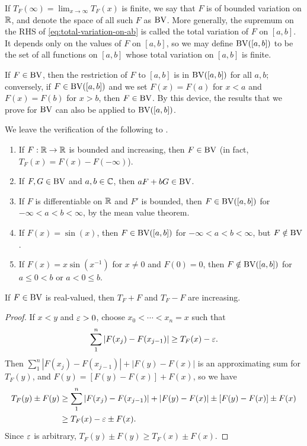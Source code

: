 \documentclass[12pt]{article} %
\begin{document}
\begin{definition}
    If $T_F(\infty) = \lim_{x \to \infty} T_F(x)$ is finite, we say that $F$ is of bounded variation on $\mathbb{R}$, and denote the space of all such $F$ as $\operatorname{BV}$. More generally, the supremum on the RHS of \cref{eq:total-variation-on-ab} is called the total variation of $F$ on $[a,b]$. It depends only on the values of $F$ on $[a,b]$, so we may define $\operatorname{BV}([a,b])$ to be the set of all functions on $[a,b]$ whose total variation on $[a,b]$ is finite.
\end{definition}

\begin{remark}
    If $F \in \operatorname{BV}$, then the restriction of $F$ to $[a,b]$ is in $\operatorname{BV}([a, b])$ for all $a, b$; conversely, if $F \in \operatorname{BV}([a, b])$ and we set $F(x) = F(a)$ for $x < a$ and $F(x) = F(b)$ for $x > b$, then $F \in \operatorname{BV}$. By this device, the results that we prove for $\operatorname{BV}$ can also be applied to $\operatorname{BV}([a,b])$.
\end{remark}

\begin{example}
    We leave the verification of the following to \citet[Exercise~27]{folland1999real}. \begin{enumerate}
        \item If $F : \mathbb{R} \to \mathbb{R}$ is bounded and increasing, then $F \in \operatorname{BV}$ (in fact, $T_F(x) = F(x) - F(-\infty)$).
        \item If $F, G \in \operatorname{BV}$ and $a, b \in \mathbb{C}$, then $aF + bG \in \operatorname{BV}$.
        \item If $F$ is differentiable on $\mathbb{R}$ and $F'$ is bounded, then $F \in \operatorname{BV}([a,b])$ for $-\infty < a < b < \infty$, by the mean value theorem.
        \item If $F(x) = \sin(x)$, then $F \in \operatorname{BV}([a,b])$ for $-\infty < a < b < \infty$, but $F \notin \operatorname{BV}$.
        \item If $F(x) = x \sin(x^{-1})$ for $x \neq 0$ and $F(0) = 0$, then $F \notin \operatorname{BV}([a, b])$ for $a \leq 0 < b$ or $a < 0 \leq b$.
    \end{enumerate}
\end{example}

\begin{lemma}\label{lem:3.26}
    If $F \in \operatorname{BV}$ is real-valued, then $T_F + F$ and $T_F - F$ are increasing.
\end{lemma}

\begin{proof}
    If $x < y$ and $\varepsilon > 0$, choose $x_0 < \cdots < x_n = x$ such that \[\sum_1^n |F(x_j) - F(x_{j-1})| \geq T_F(x) - \varepsilon.\] Then $\sum_1^n |F(x_j) - F(x_{j-1})| + |F(y) - F(x)|$ is an approximating sum for $T_F(y)$, and $F(y) = [F(y) - F(x)] + F(x)$, so we have \begin{align*}
        T_F(y) \pm F(y) &\geq \sum_1^n |F(x_j) - F(x_{j-1})| + |F(y) - F(x)| \pm [F(y) - F(x)] \pm F(x)\\
        &\geq T_F(x) - \varepsilon \pm F(x).
    \end{align*} Since $\varepsilon$ is arbitrary, $T_F(y) \pm F(y) \geq T_F(x) \pm F(x)$.
\end{proof}
\end{document}
